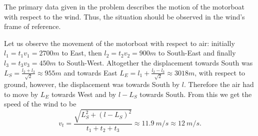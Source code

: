 {\ifEngHint
The primary data given in the problem describes the motion of the motorboat with respect to the wind. Thus, the situation should be observed in the wind’s frame of reference.
\fi


\ifEngSolution
Let us observe the movement of the motorboat with respect to air: initially $l_1=t_1v_1=\SI{2700}m$ to East, then $l_2=t_2v_2=\SI{900}m$ to South-East and finally $l_3=t_3v_3=\SI{450}m$ to South-West. Altogether the displacement towards South was $L_S=\frac{l_2+l_3}{\sqrt 2}\approx \SI{955}m$ and towards East $L_E=l_1+\frac{l_2-l_3}{\sqrt 2}\approx \SI{3018}m$, with respect to ground, however, the displacement was towards South by $l$. Therefore the air had to move by $L_E$ towards West and by $l-L_S$ towards South. From this we get the speed of the wind to be
$$v_t=\frac{\sqrt{L_S^2+(l-L_S)^2}}{t_1+t_2+t_3}\approx \SI{11.9}{m/s}\approx \SI{12}{m/s}.$$
\fi
}